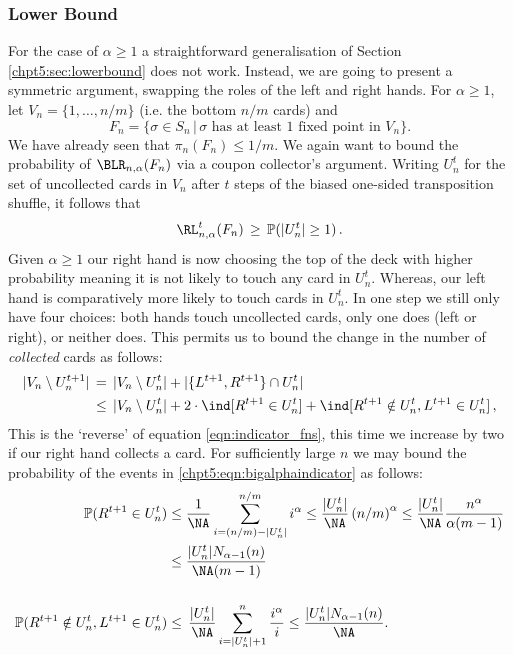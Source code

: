 \documentclass[11pt]{report}
\begin{document}
\subsubsection{Lower Bound}
For the case of $\alpha \geq 1$ a straightforward generalisation of Section \ref{chpt5:sec:lowerbound} does not work. Instead, we are going 
to present a symmetric argument, swapping the roles of the left and right hands. 
For $\alpha \geq 1$, let $V_{n} = \{1,\dots,n/m\}$ (i.e. the bottom $n/m$ cards) and
\[F_n = \{\sigma\in S_n \, | \, \text{$\sigma$ has at least 1 fixed point in 
	$V_n$}\}.\]
We have already seen that $\pi_{n}(F_n) \leq 1/m$. We again want to bound the probability of $\BLR_{n,\alpha}(F_{n})$ via a coupon collector's argument. Writing $U_n^t$ for the set of 
uncollected cards in $V_n$ after $t$  steps of the biased one-sided transposition shuffle, it 
follows that 
\begin{eqnarray}
\label{biasedIneq1}
\RL_{n,\alpha}^{t}(F_n) \,\geq\, \mathbb{P}(|U^{t}_{n}| \ge 1 )\,.
\end{eqnarray}
Given $\alpha \geq 1$ our 
right hand is now choosing the top of the deck with higher probability meaning 
it is not likely to touch any card in $U_{n}^{t}$. Whereas, our left hand is comparatively more likely to touch cards in $U_{n}^{t}$. In one step we still only have four 
choices: both hands touch uncollected cards, only one does (left or right), or neither does. This permits us to bound the change 
in the number of \emph{collected} cards as follows:
\begin{align}
|V_n\setminus U_n^{t+1}| & \,=\, |V_n\setminus U_n^{t}| + 
|\{L^{t+1},R^{t+1}\}\cap U_n^t| \nonumber \\
& \,\le\, |V_n\setminus U_n^{t}| + 2 \cdot \ind [R^{t+1}\in U_n^t] +  	\ind [R^{t+1}\notin U_n^t,L^{t+1}\in U_n^t]\,,\label{chpt5:eqn:bigalphaindicator} 	\end{align}
This is the `reverse' of equation \eqref{eqn:indicator_fns}, this time we increase by two if our right hand collects a card. For sufficiently large $n$ we may bound the 
probability of the events in \eqref{chpt5:eqn:bigalphaindicator} as follows:
\begin{align}
\mathbb{P}(R^{t+1}\in U_n^t) & \leq \frac{1}{\NA} \sum_{i=(n/m)- 
	|U_n^t|}^{n/m} i^{\alpha} \leq \frac{|U_n^t|}{\NA} 
\left(n/m\right)^{\alpha}  \leq \frac{|U_n^t|}{\NA} 
\frac{n^{\alpha}}{\alpha (m-1)} \nonumber \\
& \leq \frac{|U_n^t| N_{\alpha-1}(n)}{\NA (m-1)} 
\label{eqn:bound_minusbiga1} \\[0.5cm]
\mathbb{P}(R^{t+1}\notin U_n^t,L^{t+1}\in U_n^t) & \le\, \frac{|U_n^t|}{\NA} 
\sum_{i=|U_n^t|+1}^{n} \frac{i^{\alpha}}{i} \leq 
\frac{|U_n^t| N_{\alpha-1}(n)}{\NA}.
\label{eqn:bound_minusbiga2}
\end{align}
\end{document}
